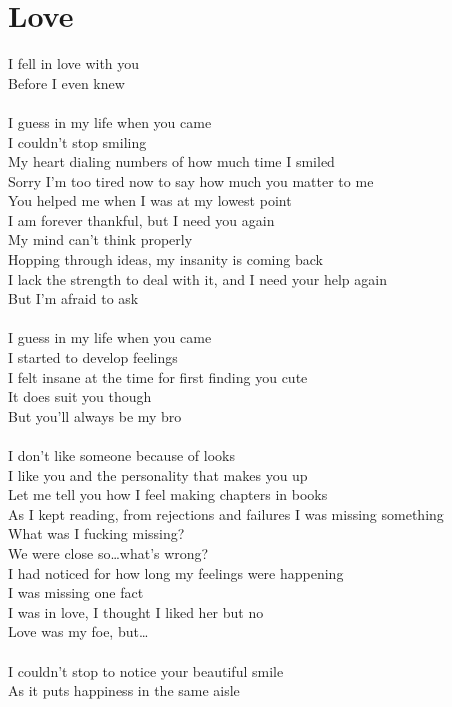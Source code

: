 \documentclass[12pt, b5paper]{article}
\begin{document}
\section{Love}
I fell in love with you 
\\Before I even knew
\\\\I guess in my life when you came 
\\I couldn’t stop smiling 
\\My heart dialing numbers of how much time I smiled 
\\Sorry I’m too tired now to say how much you matter to me 
\\You helped me when I was at my lowest point 
\\I am forever thankful, but I need you again
\\My mind can’t think properly
\\Hopping through ideas, my insanity is coming back
\\I lack the strength to deal with it, and I need your help again
\\But I’m afraid to ask
\\\\I guess in my life when you came 
\\I started to develop feelings 
\\I felt insane at the time for first finding you cute 
\\It does suit you though 
\\But you’ll always be my bro
\\\\I don’t like someone because of looks 
\\I like you and the personality that makes you up
\\Let me tell you how I feel making chapters in books 
\\As I kept reading, from rejections and failures I was missing something
\\What was I fucking missing? 
\\We were close so…what’s wrong?
\\I had noticed for how long my feelings were happening 
\\I was missing one fact
\\I was in love, I thought I liked her but no
\\Love was my foe, but…
\\\\I couldn’t stop to notice your beautiful smile 
\\As it puts happiness in the same aisle
\end{document}
